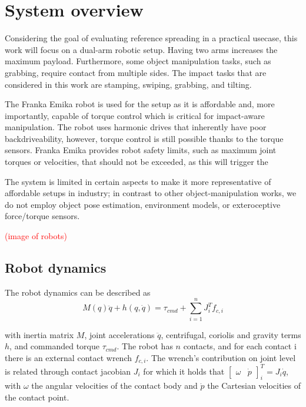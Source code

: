 \documentclass[a4paper, 10pt, conference]{ieeeconf}
\begin{document}
    \section{System overview}
    Considering the goal of evaluating reference spreading in a practical usecase, this work will focus on a dual-arm robotic setup. Having two arms increases the maximum payload. Furthermore, some object manipulation tasks, such as grabbing, require contact from multiple sides. The impact tasks that are considered in this work are stamping, swiping, grabbing, and tilting. 

    The Franka Emika robot \cite{haddadinFrankaEmikaRobot2022} is used for the setup as it is affordable and, more importantly, capable of torque control which is critical for impact-aware manipulation. The robot uses harmonic drives that inherently have poor backdriveability, however, torque control is still possible thanks to the torque sensors. Franka Emika provides robot safety limits, such as maximum joint torques or velocities, that should not be exceeded, as this will trigger the 

    The system is limited in certain aspects to make it more representative of affordable setups in industry; in contrast to other object-manipulation works, we do not employ object pose estimation, environment models, or exteroceptive force/torque sensors. 

    \textcolor{red}{(image of robots)}

    \subsection{Robot dynamics}
    The robot dynamics can be described as 
    \begin{equation}
    M(q)\ddot{q}+h(q,\dot{q})= \tau_{cmd} + \sum_{i=1}^n J_i^Tf_{c,i}
    \end{equation}
    
    with inertia matrix $M$, joint accelerations $\ddot{q}$, centrifugal, coriolis and gravity terms $h$, and commanded torque $\tau_{cmd}$. The robot has $n$ contacts, and for each contact i there is an external contact wrench $f_{c,i}$. The wrench's contribution on joint level is related through contact jacobian $J_i$ for which it holds that $\begin{bmatrix} \omega & \dot{p} \end{bmatrix}_i^T=J_i\dot{q}$, with $\omega$ the angular velocities of the contact body and $\dot{p}$ the Cartesian velocities of the contact point. 
\end{document}
